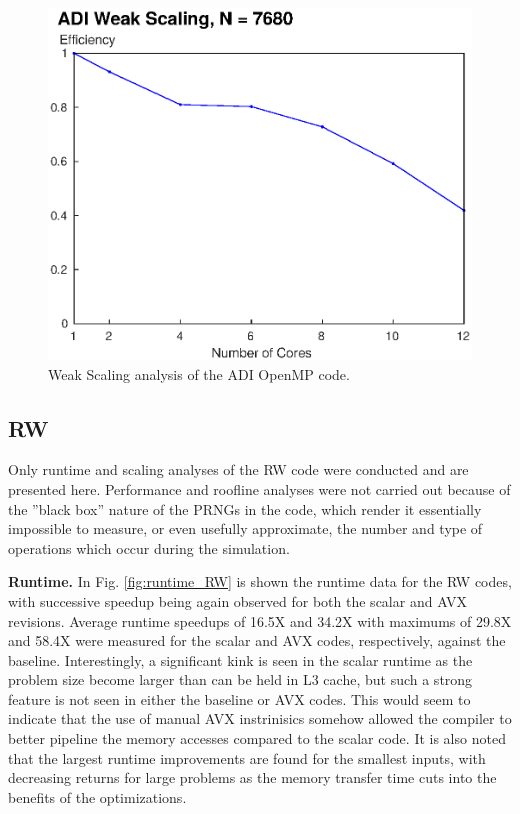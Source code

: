 \documentclass[letterpaper]{article}
\newcommand{\mypar}[1]{{\bf #1.}}
\begin{document}
\begin{figure}[!b]\centering
  \includegraphics[width=\linewidth]{./plots/scaling_weak_ADI.eps}
  \caption{Weak Scaling analysis of the ADI OpenMP code.}
  \label{fig:scaling_weak_ADI}
\end{figure}

\subsection{RW}\label{subsec:RW_results}
Only runtime and scaling analyses of the RW code were conducted and are presented here. Performance and roofline analyses were not carried out because of the ''black box'' nature of the PRNGs in the code, which render it essentially impossible to measure, or even usefully approximate, the number and type of operations which occur during the simulation.

\mypar{Runtime}
In Fig. \ref{fig:runtime_RW} is shown the runtime data for the RW codes, with successive speedup being again observed for both the scalar and AVX revisions. Average runtime speedups of 16.5X and 34.2X with maximums of 29.8X and 58.4X were measured for the scalar and AVX codes, respectively, against the baseline. Interestingly, a significant kink is seen in the scalar runtime as the problem size become larger than can be held in L3 cache, but such a strong feature is not seen in either the baseline or AVX codes. This would seem to indicate that the use of manual AVX instrinisics somehow allowed the compiler to better pipeline the memory accesses compared to the scalar code. It is also noted that the largest runtime improvements are found for the smallest inputs, with decreasing returns for large problems as the memory transfer time cuts into the benefits of the optimizations.
\end{document}
